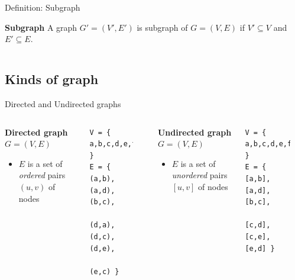 \documentclass[compress]{beamer}
\begin{document}
\begin{frame}{Definition: Subgraph}
  \begin{block}{\textbf{Subgraph}}
    A graph $G' = (V', E')$ is subgraph of $G = (V, E)$ if $V' \subseteq V$ and $E' \subseteq E$.
  \end{block}
  \begin{columns}
  \begin{center}
  \scalebox{0.7}{}
  \end{center}
  \begin{center}
  \scalebox{0.7}{}
  \end{center}
  \end{columns}
\end{frame}

\subsection{Kinds of graph}
\begin{frame}[fragile]{Directed and Undirected graphs}
  \begin{columns}
  \begin{block}{\textbf{Directed graph} $G = (V, E)$}
    \begin{itemize}
      \item $E$ is a set of \emph{ordered} pairs $(u, v)$ of nodes
    \end{itemize}
  \end{block}
  \begin{verbatim}
V = { a,b,c,d,e,f }
E = { (a,b),(a,d),(b,c),
      (d,a),(d,c),(d,e),
      (e,c) }
  \end{verbatim}
  \begin{center}
  \scalebox{0.65}{}
  \end{center}
  \begin{block}{\textbf{Undirected graph} $G = (V, E)$}
    \begin{itemize}
      \item $E$ is a set of \emph{unordered} pairs $[u, v]$ of nodes
    \end{itemize}
  \end{block}
  \begin{verbatim}
V = { a,b,c,d,e,f }
E = { [a,b],[a,d],[b,c],
      [c,d],[c,e],[e,d] }

  \end{verbatim}
  \begin{center}
  \scalebox{0.65}{}
  \end{center}
\end{columns}
\end{frame}
\end{document}
